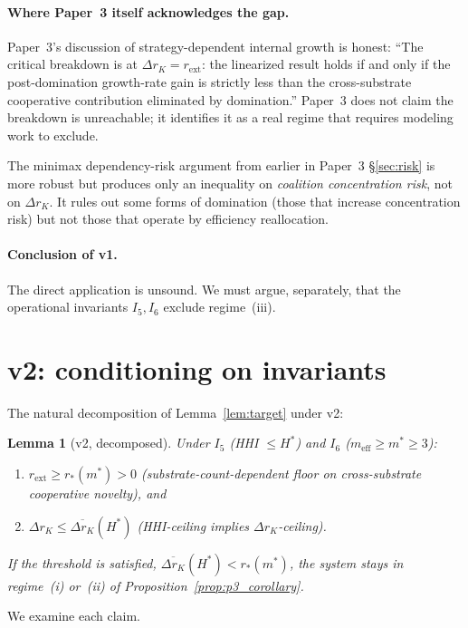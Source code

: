 \documentclass{article}
\newtheorem{lemma}{Lemma}
\newcommand{\rext}{r_{\mathrm{ext}}}
\newcommand{\meff}{m_{\mathrm{eff}}}
\begin{document}
\paragraph{Where Paper~3 itself acknowledges the gap.}
Paper~3's discussion of strategy-dependent internal growth is honest:
``The critical breakdown is at $\Delta r_K = \rext$: the linearized
result holds if and only if the post-domination growth-rate gain is
strictly less than the cross-substrate cooperative contribution
eliminated by domination.''  Paper~3 does not claim the breakdown is
unreachable; it identifies it as a real regime that requires modeling
work to exclude.

The minimax dependency-risk argument from earlier in Paper~3
\S\ref{sec:risk} is more robust but produces only an inequality on
\emph{coalition concentration risk}, not on $\Delta r_K$.  It rules out
some forms of domination (those that increase concentration risk) but
not those that operate by efficiency reallocation.

\paragraph{Conclusion of v1.}
The direct application is unsound.  We must argue, separately, that
the operational invariants $I_5, I_6$ exclude regime~(iii).

\section{v2: conditioning on invariants}

The natural decomposition of Lemma~\ref{lem:target} under v2:

\begin{lemma}[v2, decomposed]
\label{lem:v2}
Under $I_5$ (HHI $\leq H^*$) and $I_6$ ($\meff \geq m^* \geq 3$):
\begin{enumerate}
\item[(A)] $\rext \geq r_*(m^*) > 0$ (substrate-count-dependent floor on
  cross-substrate cooperative novelty), and
\item[(B)] $\Delta r_K \leq \overline{\Delta r_K}(H^*)$ (HHI-ceiling
  implies $\Delta r_K$-ceiling).
\end{enumerate}
If the threshold is satisfied, $\overline{\Delta r_K}(H^*) < r_*(m^*)$,
the system stays in regime~(i) or~(ii) of
Proposition~\ref{prop:p3_corollary}.
\end{lemma}

We examine each claim.
\end{document}
